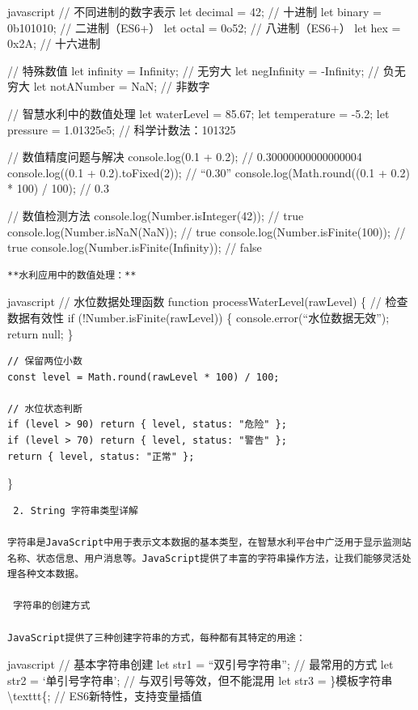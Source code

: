 javascript // 不同进制的数字表示 let decimal = 42; // 十进制 let binary = 0b101010; // 二进制（ES6+） let octal = 0o52; // 八进制（ES6+） let hex = 0x2A; // 十六进制

// 特殊数值 let infinity = Infinity; // 无穷大 let negInfinity = -Infinity; // 负无穷大 let notANumber = NaN; // 非数字

// 智慧水利中的数值处理 let waterLevel = 85.67; let temperature = -5.2; let pressure = 1.01325e5; // 科学计数法：101325

// 数值精度问题与解决 console.log(0.1 + 0.2); // 0.30000000000000004 console.log((0.1 + 0.2).toFixed(2)); // ``0.30'' console.log(Math.round((0.1 + 0.2) * 100) / 100); // 0.3

// 数值检测方法 console.log(Number.isInteger(42)); // true console.log(Number.isNaN(NaN)); // true console.log(Number.isFinite(100)); // true console.log(Number.isFinite(Infinity)); // false

\begin{lstlisting}
**水利应用中的数值处理：**
\end{lstlisting}

javascript // 水位数据处理函数 function processWaterLevel(rawLevel) \{ // 检查数据有效性 if (!Number.isFinite(rawLevel)) \{ console.error(``水位数据无效''); return null; \}

\begin{verbatim}
// 保留两位小数
const level = Math.round(rawLevel * 100) / 100;

// 水位状态判断
if (level > 90) return { level, status: "危险" };
if (level > 70) return { level, status: "警告" };
return { level, status: "正常" };
\end{verbatim}

\}

\begin{lstlisting}
 2. String 字符串类型详解

字符串是JavaScript中用于表示文本数据的基本类型，在智慧水利平台中广泛用于显示监测站名称、状态信息、用户消息等。JavaScript提供了丰富的字符串操作方法，让我们能够灵活处理各种文本数据。

 字符串的创建方式

JavaScript提供了三种创建字符串的方式，每种都有其特定的用途：
\end{lstlisting}

javascript // 基本字符串创建 let str1 = ``双引号字符串''; // 最常用的方式 let str2 = `单引号字符串'; // 与双引号等效，但不能混用 let str3 = \}模板字符串\textbackslash texttt\{; // ES6新特性，支持变量插值

